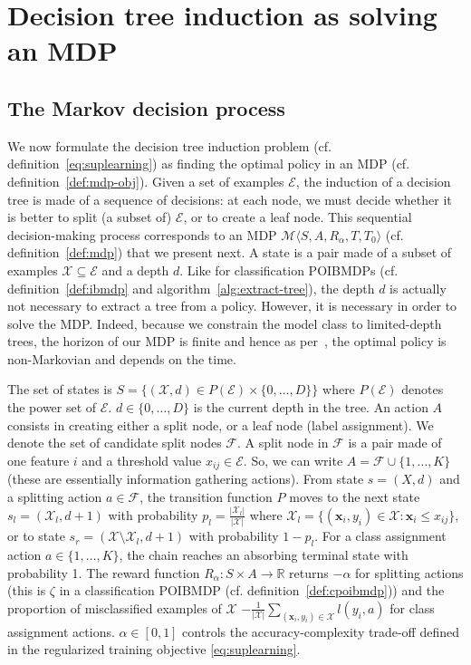 \chapter{Decision tree induction as solving an MDP}\label{sec:dt-mdp}

\section{The Markov decision process}\label{sec:the-mdp}
We now formulate the decision tree induction problem (cf. definition~\ref{eq:suplearning}) as finding the optimal policy in an MDP (cf. definition~\ref{def:mdp-obj}).
Given a set of examples $\mathcal{E}$, the induction of a decision tree is made of a sequence of decisions: at each node, we must decide whether it is better to split (a subset of) $\mathcal{E}$, or %
to create a leaf node.
This sequential decision-making process corresponds to an MDP $\mathcal{M} \langle S, A, R_{\alpha}, T, T_0 \rangle$ (cf. definition~\ref{def:mdp}) that we present next.
A state is a pair made of a subset of examples $\mathcal{X}\subseteq\mathcal E$ and a depth $d$.
Like for classification POIBMDPs (cf. definition~\ref{def:ibmdp} and algorithm~\ref{alg:extract-tree}), the depth $d$ is actually not necessary to extract a tree from a policy.
However, it is necessary in order to solve the MDP.
Indeed, because we constrain the model class to limited-depth trees, the horizon of our MDP is finite and hence as per~\cite{puterman}, the optimal policy is non-Markovian and depends on the time.

The set of states is $S = \{ (\mathcal{X}, d) \in P(\mathcal{E}) \times \{0, \ldots, D\} \}$ where $P(\mathcal{E})$ denotes the power set of $\mathcal{E}$. $d \in \{0,\ldots,D\}$ is the current depth in the tree.
An action $A$ consists in creating either a split node, or a leaf node (label assignment). We denote the set of candidate split nodes $ {\mathcal F} $. A split node in $\mathcal F$ is a pair made of one feature $i$ and a threshold value $x_{ij}\in \mathcal{E}$.
So, we can write $A = {\mathcal{F} \cup \{ 1, \ldots, K \}}$ (these are essentially information gathering actions).
From state $s=(X,d)$ and a splitting action $a \in {\mathcal F}$, the transition function $P$ moves to the next state $s_l = (\mathcal{X}_l, d+1)$ with probability $p_l = \frac{|\mathcal{X}_l|}{|\mathcal{X}|}$ where $\mathcal{X}_l = \{(\boldsymbol{x}_i, y_i) \in \mathcal{X}: \boldsymbol{x}_i \leq x_{ij}\}$, or to state $s_r = (\mathcal{X} \setminus \mathcal{X}_l, d+1)$ with probability $1-p_l$. For a class assignment action $a \in \{1,\ldots,K\}$, the chain reaches an absorbing terminal state with probability 1. 
The reward function $R_{\alpha}: S \times A \rightarrow \mathbb{R}$ returns $-\alpha$ for splitting actions (this is $\zeta$ in a classification POIBMDP (cf. definition~\ref{def:cpoibmdp})) and the proportion of misclassified examples of $\mathcal{X}$ $-\frac{1}{|\mathcal{X}|}\sum_{(\boldsymbol{x}_i,y_i) \in \mathcal{X}} l(y_i, a)$ for class assignment actions. $\alpha \in [0,1]$ controls the accuracy-complexity trade-off defined in the regularized training objective \ref{eq:suplearning}. 

